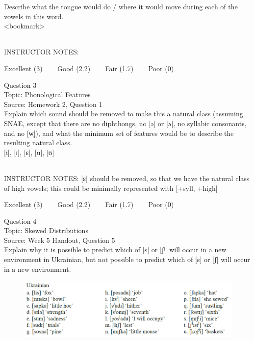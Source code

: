 \documentclass[12pt]{article}
\begin{document}
Describe what the tongue would do / where it would move during each of the vowels in this word.\\

<bookmark>


~\\
INSTRUCTOR NOTES: 


\vfill
Excellent (3) ~~~ Good (2.2) ~~~ Fair (1.7) ~~~ Poor (0)
\newpage

{\large Question 3}\\

Topic: Phonological Features\\
Source: Homework 2, Question 1\\

Explain which sound should be removed to make this a natural class (assuming SNAE, except that there are no diphthongs, no [ə] or [ʌ], no syllabic consonants, and no [w̥]), and what the minimum set of features would be to describe the resulting natural class.\\

{[i]}, {[ɪ]}, {[ɛ]}, {[u]}, {[ʊ]}


~\\
INSTRUCTOR NOTES: [ɛ] should be removed, so that we have the natural class of high vowels; this could be minimally represented with [+syll, +high]


\vfill
Excellent (3) ~~~ Good (2.2) ~~~ Fair (1.7) ~~~ Poor (0)
\newpage

{\large Question 4}\\

Topic: Skewed Distributions\\
Source: Week 5 Handout, Question 5\\

Explain why it is possible to predict which of [s] or [ʃʲ] will occur in a new environment in Ukrainian, but not possible to predict which of [s] or [ʃ] will occur in a new environment.\\

\begin{figure}[H]
\includegraphics{../images/ukrainian.png}
\end{figure}
\end{document}
